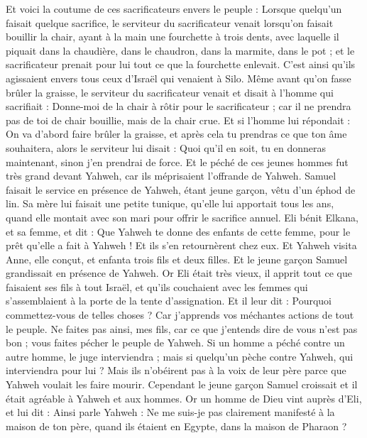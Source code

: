 \begin{multicols}{2}
Et voici la coutume de ces sacrificateurs envers le peuple : Lorsque quelqu'un faisait quelque sacrifice, le serviteur du sacrificateur venait lorsqu'on faisait bouillir la chair, ayant à la main une fourchette à trois dents,
avec laquelle il piquait dans la chaudière, dans le chaudron, dans la marmite, dans le pot ; et le sacrificateur prenait pour lui tout ce que la fourchette enlevait. C’est ainsi qu’ils agissaient envers tous ceux d'Israël qui venaient à Silo.
Même avant qu'on fasse brûler la graisse, le serviteur du sacrificateur venait et disait à l'homme qui sacrifiait : Donne-moi de la chair à rôtir pour le sacrificateur ; car il ne prendra pas de toi de chair bouillie, mais de la chair crue.
Et si l'homme lui répondait : On va d’abord faire brûler la graisse, et après cela tu prendras ce que ton âme souhaitera, alors le serviteur lui disait : Quoi qu'il en soit, tu en donneras maintenant, sinon j'en prendrai de force.
Et le péché de ces jeunes hommes fut très grand devant Yahweh, car ils méprisaient l’offrande de Yahweh.
Samuel faisait le service en présence de Yahweh, étant jeune garçon, vêtu d'un éphod de lin.
Sa mère lui faisait une petite tunique, qu'elle lui apportait tous les ans, quand elle montait avec son mari pour offrir le sacrifice annuel.
Eli bénit Elkana, et sa femme, et dit : Que Yahweh te donne des enfants de cette femme, pour le prêt qu’elle a fait à Yahweh ! Et ils s'en retournèrent chez eux.
Et Yahweh visita Anne, elle conçut, et enfanta trois fils et deux filles. Et le jeune garçon Samuel grandissait en présence de Yahweh.
Or Eli était très vieux, il apprit tout ce que faisaient ses fils à tout Israël, et qu'ils couchaient avec les femmes qui s'assemblaient à la porte de la tente d'assignation.
Et il leur dit : Pourquoi commettez-vous de telles choses ? Car j'apprends vos méchantes actions de tout le peuple.
Ne faites pas ainsi, mes fils, car ce que j'entends dire de vous n'est pas bon ; vous faites pécher le peuple de Yahweh.
Si un homme a péché contre un autre homme, le juge interviendra ; mais si quelqu'un pèche contre Yahweh, qui interviendra pour lui ? Mais ils n'obéirent pas à la voix de leur père parce que Yahweh voulait les faire mourir.
Cependant le jeune garçon Samuel croissait et il était agréable à Yahweh et aux hommes.
Or un homme de Dieu vint auprès d’Eli, et lui dit : Ainsi parle Yahweh : Ne me suis-je pas clairement manifesté à la maison de ton père, quand ils étaient en Egypte, dans la maison de Pharaon ?

\end{multicols}
